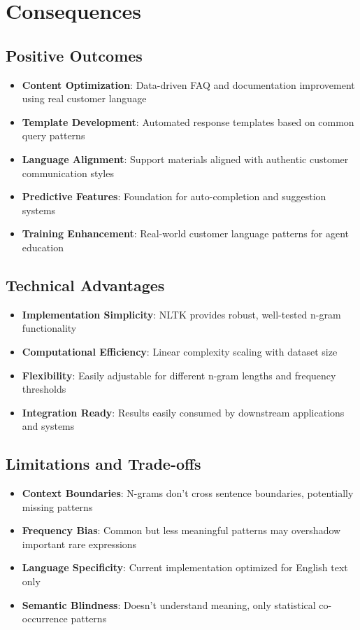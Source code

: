 \documentclass[11pt]{article}
\begin{document}
\section{Consequences}

\subsection{Positive Outcomes}
\begin{itemize}
\item \textbf{Content Optimization}: Data-driven FAQ and documentation improvement using real customer language
\item \textbf{Template Development}: Automated response templates based on common query patterns
\item \textbf{Language Alignment}: Support materials aligned with authentic customer communication styles
\item \textbf{Predictive Features}: Foundation for auto-completion and suggestion systems
\item \textbf{Training Enhancement}: Real-world customer language patterns for agent education
\end{itemize}

\subsection{Technical Advantages}
\begin{itemize}
\item \textbf{Implementation Simplicity}: NLTK provides robust, well-tested n-gram functionality
\item \textbf{Computational Efficiency}: Linear complexity scaling with dataset size
\item \textbf{Flexibility}: Easily adjustable for different n-gram lengths and frequency thresholds
\item \textbf{Integration Ready}: Results easily consumed by downstream applications and systems
\end{itemize}

\subsection{Limitations and Trade-offs}
\begin{itemize}
\item \textbf{Context Boundaries}: N-grams don't cross sentence boundaries, potentially missing patterns
\item \textbf{Frequency Bias}: Common but less meaningful patterns may overshadow important rare expressions
\item \textbf{Language Specificity}: Current implementation optimized for English text only
\item \textbf{Semantic Blindness}: Doesn't understand meaning, only statistical co-occurrence patterns
\end{itemize}
\end{document}
